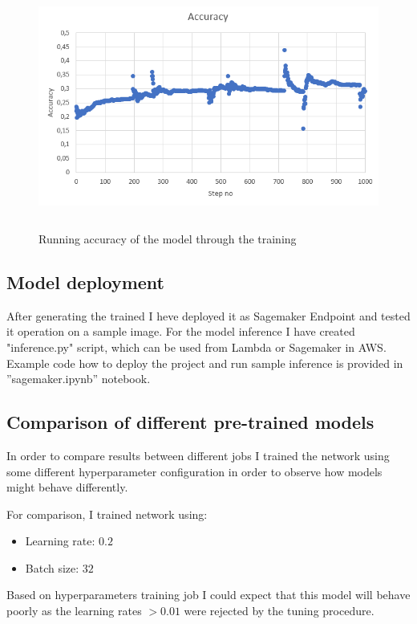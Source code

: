 \documentclass{article}
\begin{document}
\begin{figure}[ht]
	\centering
	\includegraphics[height=80mm]{../project/accuracy.png}
	\caption{Running accuracy of the model through the training}
	\label{fig:acc}
\end{figure}

\FloatBarrier
\subsection{Model deployment}
After generating the trained I heve deployed it as Sagemaker Endpoint and tested it operation on a sample image. For the model inference I have created "inference.py" script, which can be used from Lambda or Sagemaker in AWS. Example code how to deploy the project and run sample inference is provided in ''sagemaker.ipynb'' notebook.

\subsection{Comparison of different pre-trained models}
In order to compare results between different jobs I trained the network using some different hyperparameter configuration in order to observe how models might behave differently.

For comparison, I trained network using:
\begin{itemize}
	\item Learning rate: $0.2$
	\item Batch size: $32$
\end{itemize}
Based on hyperparameters training job I could expect that this model will behave poorly as the learning rates $> 0.01$ were rejected by the tuning procedure.
\end{document}
